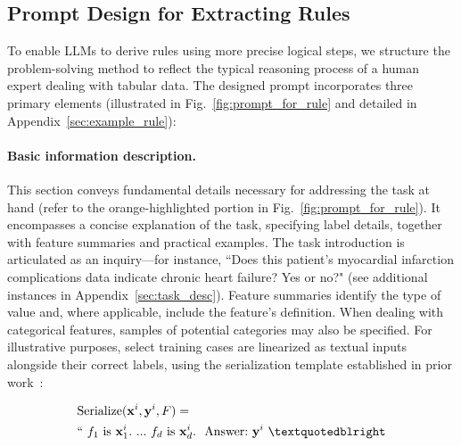 \subsection{Prompt Design for Extracting Rules}
\label{Sec:prompt_design}
To enable LLMs to derive rules using more precise logical steps, we structure the problem-solving method to reflect the typical reasoning process of a human expert dealing with tabular data. The designed prompt incorporates three primary elements (illustrated in Fig.~\ref{fig:prompt_for_rule} and detailed in Appendix~\ref{sec:example_rule}):

\vspace*{-0.12in}
\paragraph{Basic information description.} This section conveys fundamental details necessary for addressing the task at hand (refer to the orange-highlighted portion in Fig.~\ref{fig:prompt_for_rule}). It encompasses a concise explanation of the task, specifying label details, together with feature summaries and practical examples. The task introduction is articulated as an inquiry—for instance, ``Does this patient's myocardial infarction complications data indicate chronic heart failure? Yes or no?" (see additional instances in Appendix~\ref{sec:task_desc}). Feature summaries identify the type of value and, where applicable, include the feature's definition. When dealing with categorical features, samples of potential categories may also be specified. For illustrative purposes, select training cases are linearized as textual inputs alongside their correct labels, using the serialization template established in prior work~\cite{dinh2022lift,hegselmann2023tabllm}:

\begin{align}
&\text{Serialize}(\mathbf{x}^i,\mathbf{y}^i, F) = \nonumber \\ 
&``\ f_1\ \text{is}\ \mathbf{x}^i_1.\ ... \ f_d\  \text{is}\  \mathbf{x}^i_d.\ \ \text{Answer:}\  \mathbf{y}^i\ ”
\end{align}

\vspace*{-0.12in}
